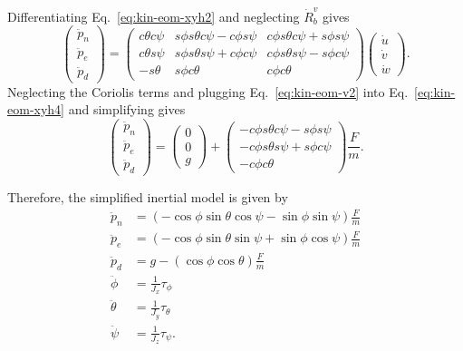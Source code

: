 {Differentiating Eq.~\eqref{eq:kin-eom-xyh2} and neglecting
$\dot{R}_b^v$ gives
\begin{equation}\label{eq:kin-eom-xyh4}
\begin{pmatrix} \ddot{p}_n \\ \ddot{p}_e \\ \ddot{p}_d \end{pmatrix}
= \begin{pmatrix} c\theta c\psi & s\phi s\theta c\psi - c\phi s\psi
    & c\phi s\theta c\psi + s\phi s\psi \\
    c\theta s\psi &  s\phi s\theta s\psi + c\phi c\psi
    & c\phi s\theta s\psi - s\phi c\psi  \\
    -s\theta & s\phi c\theta & c\phi c\theta
    \end{pmatrix}
    \begin{pmatrix} \dot{u} \\ \dot{v} \\ \dot{w} \end{pmatrix}.
\end{equation}
Neglecting the Coriolis terms and plugging Eq.~\eqref{eq:kin-eom-v2}
into Eq.~\eqref{eq:kin-eom-xyh4} and simplifying gives
\begin{equation}\label{eq:kin-xyh-ddot}
\begin{pmatrix} \ddot{p}_n \\ \ddot{p}_e \\ \ddot{p}_d \end{pmatrix}
= \begin{pmatrix} 0 \\ 0 \\ g \end{pmatrix} +
\begin{pmatrix}
    -c\phi s\theta c\psi - s\phi s\psi \\
    -c\phi s\theta s\psi + s\phi c\psi  \\
    -c\phi c\theta
    \end{pmatrix}
    \frac{F}{m}.
\end{equation}

Therefore, the simplified inertial model is given by
\begin{align}
\ddot{p}_n    &= \left(-\cos\phi \sin\theta \cos\psi - \sin\phi
\sin\psi \right) \frac{F}{m}
\label{eq:quadrotor-simple-pn} \\
\ddot{p}_e    &= \left( -\cos\phi \sin\theta \sin\psi + \sin\phi
\cos\psi \right) \frac{F}{m}
\label{eq:quadrotor-simple-pe} \\
\ddot{p}_d      &= g - \left( \cos\phi \cos\theta \right)
\frac{F}{m}
\label{eq:quadrotor-simple-h} \\
\ddot{\phi}   &= \frac{1}{J_x} \tau_{\phi}
\label{eq:quadrotor-simple-phi} \\
\ddot{\theta} &= \frac{1}{J_y} \tau_{\theta}
\label{eq:quadrotor-simple-theta} \\
\ddot{\psi}   &= \frac{1}{J_z} \tau_{\psi}.
\label{eq:quadrotor-simple-psi} \\
\end{align}

}
